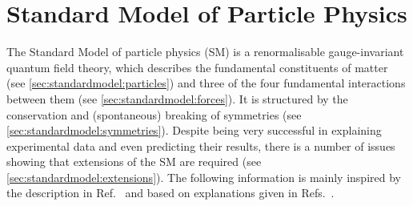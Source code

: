 
\chapter{Standard Model of Particle Physics}
\label{sec:standardmodel}

The Standard Model of particle physics (SM) is a renormalisable
gauge-invariant quantum field theory, which describes the fundamental
constituents of matter (see \cref{sec:standardmodel:particles}) and three of
the four fundamental interactions between them (see
\cref{sec:standardmodel:forces}). It is structured by the conservation
and (spontaneous) breaking of symmetries (see
\cref{sec:standardmodel:symmetries}). Despite being very successful in
explaining experimental data and even predicting their results, there is a
number of issues showing that extensions of the SM are required (see
\cref{sec:standardmodel:extensions}). The following information is mainly
inspired by the description in Ref.~\cite{Brock:2011zz} and based on
explanations given in Refs.~\cite{Griffiths:2008zz,Perkins:1982xb}.







